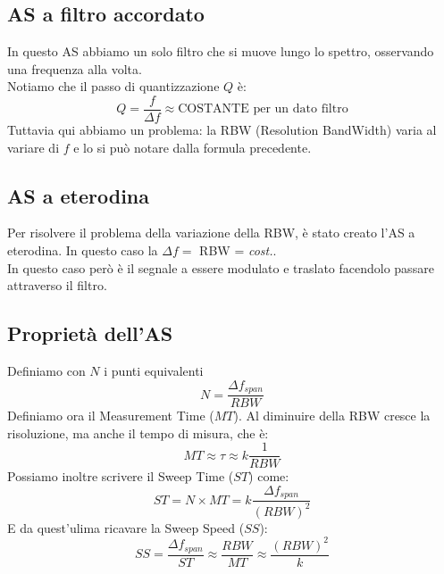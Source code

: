 \documentclass{article}
\begin{document}
	\subsection*{AS a filtro accordato}
	In questo AS abbiamo un solo filtro che si muove lungo lo spettro, osservando una frequenza alla volta.\\
	Notiamo che il passo di quantizzazione $Q$ è:
	\begin{equation}
		Q = \frac{f}{\Delta f} \approx \text{COSTANTE per un dato filtro}
	\end{equation}
	Tuttavia qui abbiamo un problema: la RBW (Resolution BandWidth) varia al variare di $f$ e lo si può notare dalla formula precedente.
	\subsection*{AS a eterodina}
	Per risolvere il problema della variazione della RBW, è stato creato l'AS a eterodina. In questo caso la $\Delta f =$ RBW = \textit{cost.}.\\
	In questo caso però è il segnale a essere modulato e traslato facendolo passare attraverso il filtro.
	\subsection*{Proprietà dell'AS}
	Definiamo con $N$ i punti equivalenti
	\begin{equation}
		N = \frac{\Delta f_{span}}{RBW}
	\end{equation}
	Definiamo ora il Measurement Time ($MT$). Al diminuire della RBW cresce la risoluzione, ma anche il tempo di misura, che è:
	\begin{equation}
		MT \approx \tau \approx k\frac{1}{RBW}
	\end{equation}
	Possiamo inoltre scrivere il Sweep Time ($ST$) come:
	\begin{equation}
		ST = N \times MT =  k\frac{\Delta f_{span}}{(RBW)^2}
	\end{equation}
	E da quest'ulima ricavare la Sweep Speed ($SS$):
	\begin{equation}
		SS = \frac{\Delta f_{span}}{ST} \approx \frac{RBW}{MT} \approx \frac{(RBW)^2}{k}
 	\end{equation}
\end{document}
